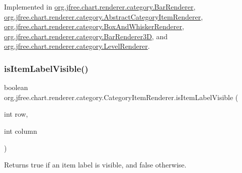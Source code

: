 Implemented in \mbox{\hyperlink{classorg_1_1jfree_1_1chart_1_1renderer_1_1category_1_1_bar_renderer_a6e4d149cf05c5661c9b6d2d748ceba36}{org.\+jfree.\+chart.\+renderer.\+category.\+Bar\+Renderer}}, \mbox{\hyperlink{classorg_1_1jfree_1_1chart_1_1renderer_1_1category_1_1_abstract_category_item_renderer_a9cfe3bcab2e0572bf9e9c5ca38c63346}{org.\+jfree.\+chart.\+renderer.\+category.\+Abstract\+Category\+Item\+Renderer}}, \mbox{\hyperlink{classorg_1_1jfree_1_1chart_1_1renderer_1_1category_1_1_box_and_whisker_renderer_a408aa43577d1f5ed5af1685069a8c409}{org.\+jfree.\+chart.\+renderer.\+category.\+Box\+And\+Whisker\+Renderer}}, \mbox{\hyperlink{classorg_1_1jfree_1_1chart_1_1renderer_1_1category_1_1_bar_renderer3_d_a157bf5d34311c199b378b5a53394f64b}{org.\+jfree.\+chart.\+renderer.\+category.\+Bar\+Renderer3D}}, and \mbox{\hyperlink{classorg_1_1jfree_1_1chart_1_1renderer_1_1category_1_1_level_renderer_abed5cde7c6ab65c2576e9b1479178ef5}{org.\+jfree.\+chart.\+renderer.\+category.\+Level\+Renderer}}.

\mbox{\label{interfaceorg_1_1jfree_1_1chart_1_1renderer_1_1category_1_1_category_item_renderer_a66d6f6e5d321583a923cfbad21e4161e}} 
\subsubsection{\texorpdfstring{is\+Item\+Label\+Visible()}{isItemLabelVisible()}}
{\footnotesize\ttfamily boolean org.\+jfree.\+chart.\+renderer.\+category.\+Category\+Item\+Renderer.\+is\+Item\+Label\+Visible (\begin{DoxyParamCaption}\item[{int}]{row,  }\item[{int}]{column }\end{DoxyParamCaption})}

Returns {\ttfamily true} if an item label is visible, and {\ttfamily false} otherwise.


